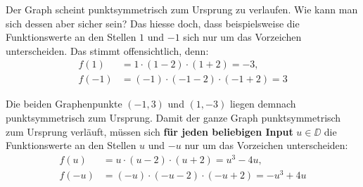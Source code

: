 \begin{center}
\end{center}

Der Graph scheint punktsymmetrisch zum Ursprung zu verlaufen.
Wie kann man sich dessen aber sicher sein?
Das hiesse doch, dass beispielsweise die Funktionswerte
an den Stellen \(1\) und \(-1\) sich nur um das Vorzeichen
unterscheiden. Das stimmt offensichtlich, denn:
\begin{align*}
    f(1)  & = 1\cdot(1-2)\cdot(1+2)=-3,    \\
    f(-1) & = (-1)\cdot(-1-2)\cdot(-1+2)=3
\end{align*}

Die beiden Graphenpunkte \((-1, 3)\) und \((1, -3)\) liegen
demnach punktsymmetrisch zum Ursprung. Damit der ganze Graph
punktsymmetrisch zum Ursprung verläuft, müssen sich
\textbf{für jeden beliebigen Input} \(u\in\DD\)
die Funktionswerte an den Stellen \(u\) und
\(-u\) nur um das Vorzeichen unterscheiden:
\begin{align*}
    f(u)
     & = u\cdot(u-2)\cdot(u+2)
    = u^3-4u,                       \\
    f(-u)
     & = (-u)\cdot(-u-2)\cdot(-u+2)
    = -u^3+4u
\end{align*}

